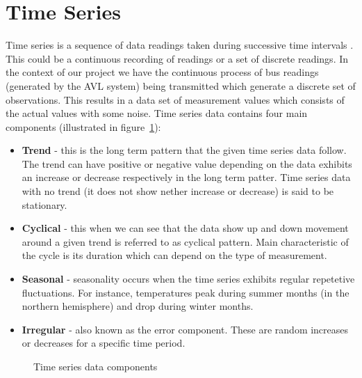\section{Time Series}
Time series is a sequence of data readings taken during successive time intervals \cite{shumway2010time}. This could be a continuous recording of readings or a set of discrete readings. In the context of our project we have the continuous process of bus readings (generated by the AVL system) being transmitted which generate a discrete set of observations. This results in a data set of measurement values which consists of the actual values with some noise. Time series data contains four main components (illustrated in figure~\ref{fig:timeSeriesDataComponents})\cite{brockwell2002introduction}:
\begin{itemize}
	\item \textbf{Trend} - this is the long term pattern that the given time series data follow. The trend can have positive or negative value depending on the data exhibits an increase or decrease respectively in the long term patter. Time series data with no trend (it does not show nether increase or decrease) is said to be stationary.
	\item \textbf{Cyclical} - this when we can see that the data show up and down movement around a given trend is referred to as cyclical pattern. Main characteristic of the cycle is its duration which can depend on the type of measurement.
	\item \textbf{Seasonal} - seasonality occurs when the time series exhibits regular repetetive fluctuations. For instance, temperatures peak during summer months (in the northern hemisphere) and drop during winter months.
	\item \textbf{Irregular} - also known as the error component. These are random increases or decreases for a specific time period.
\end{itemize}

\begin{figure}[ht]
	\caption{Time series data components}%
	\label{fig:timeSeriesDataComponents}
\end{figure}

